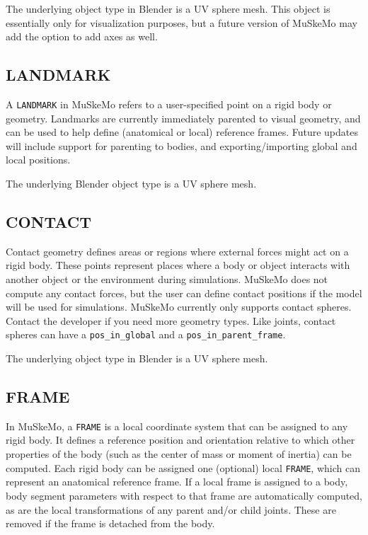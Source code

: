 \documentclass{article}
\begin{document}
The underlying object type in Blender is a UV sphere mesh. This object is essentially only for visualization purposes, but a future version of MuSkeMo may add the option to add axes as well.

\subsection{LANDMARK}
\label{sec:landmark}

A \texttt{LANDMARK} in MuSkeMo refers to a user-specified point on a rigid body or geometry. Landmarks are currently immediately parented to visual geometry, and can be used to help define (anatomical or local) reference frames. Future updates will include support for parenting to bodies, and exporting/importing global and local positions.

The underlying Blender object type is a UV sphere mesh.

\subsection{CONTACT}

Contact geometry defines areas or regions where external forces might act on a rigid body. These points represent places where a body or object interacts with another object or the environment during simulations. MuSkeMo does not compute any contact forces, but the user can define contact positions if the model will be used for simulations. MuSkeMo currently only supports contact spheres. Contact the developer if you need more geometry types. 
Like joints, contact spheres can have a \texttt{pos\_in\_global} and a \texttt{pos\_in\_parent\_frame}.


The underlying object type in Blender is a UV sphere mesh.


\subsection{FRAME}
\label{sec:frame}
In MuSkeMo, a \texttt{FRAME} is a local coordinate system that can be assigned to any rigid body. It defines a reference position and orientation relative to which other properties of the body (such as the center of mass or moment of inertia) can be computed. Each rigid body can be assigned one (optional) local \texttt{FRAME}, which can represent an anatomical reference frame. If a local frame is assigned to a body, body segment parameters with respect to that frame are automatically computed, as are the local transformations of any parent and/or child joints. These are removed if the frame is detached from the body.
\end{document}
